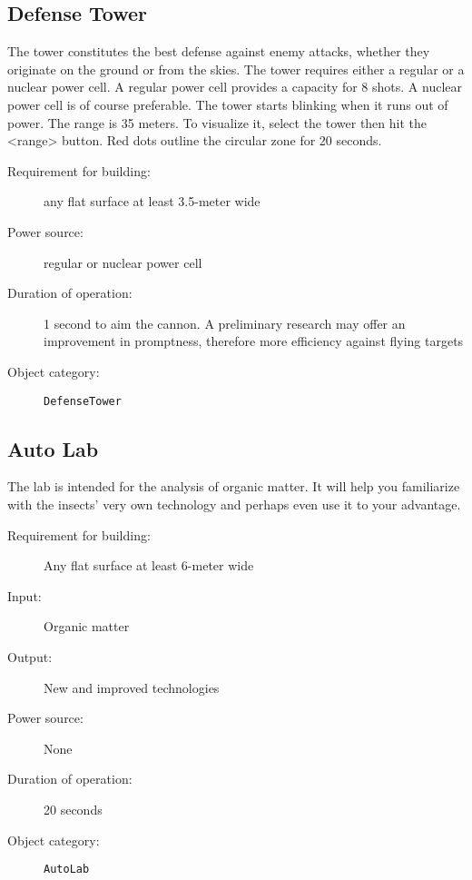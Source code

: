 \subsection{Defense Tower}

The tower constitutes the best defense against enemy attacks, whether they originate on the ground or from the skies. The tower requires either a regular or a nuclear power cell. A regular power cell provides a capacity for 8 shots. A nuclear power cell is of course preferable. The tower starts blinking when it runs out of power. The range is 35 meters. To visualize it, select the tower then hit the <range> button. Red dots outline the circular zone for 20 seconds.

\begin{description}
    \item[Requirement for building:] any flat surface at least 3.5-meter wide
    \item[Power source:] regular or nuclear power cell
    \item[Duration of operation:] 1 second to aim the cannon. A preliminary research may offer an improvement in promptness, therefore more efficiency against flying targets
    \item[Object category:] \texttt{DefenseTower}
\end{description}


\subsection{Auto Lab}

The lab is intended for the analysis of organic matter. It will help you familiarize with the insects' very own technology and perhaps even use it to your advantage.

\begin{description}
    \item[Requirement for building:] Any flat surface at least 6-meter wide
    \item[Input:] Organic matter
    \item[Output:] New and improved technologies
    \item[Power source:] None
    \item[Duration of operation:] 20 seconds
    \item[Object category:] \texttt{AutoLab}
\end{description}


